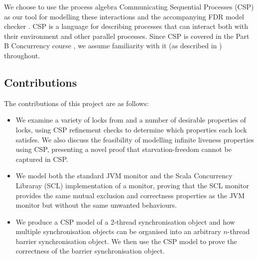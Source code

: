 
We choose to use the process algebra Communicating Sequential Processes (CSP) \cite{RoscoeUCS} as our tool for modelling these interactions and the accompanying FDR model checker \cite{GibsonFDR}. CSP is a language for describing processes that can interact both with their environment and other parallel processes. Since CSP is covered in the Part B Concurrency course \cite{Concurrency}, we assume familiarity with it (as described in \cite{RoscoeUCS}) throughout.



\subsection{Contributions}

The contributions of this project are as follows:

\begin{itemize}
  \item We examine a variety of locks from \cite{CADS} and a number of desirable properties of locks, using CSP refinement checks to determine which properties each lock satisfes. We also discuss the feasibility of modelling infinite liveness properties using CSP, presenting a novel proof that starvation-freedom cannot be captured in CSP.
  \item We model both the standard JVM monitor and the Scala Concurrency Libraray (SCL) \cite{CP} implementation of a monitor, proving that the SCL monitor provides the same mutual exclusion and correctness properties as the JVM monitor but without the same unwanted behaviours.
  \item We produce a CSP model of a 2-thread synchronisation object and how multiple synchronisation objects can be organised into an arbitrary $n$-thread barrier synchronisation object. We then use the CSP model to prove the correctness of the barrier synchronisation object.
\end{itemize}



